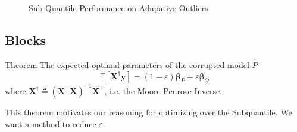 \documentclass[
11pt, %
serif
]{beamer}
\begin{document}
\begin{frame}
\begin{figure}[!t]
			\caption{Sub-Quantile Performance on Adapative Outliers}
			\label{fig:structure-unstructured-noise}
		\end{figure}
		
	\end{frame}
	
	
	\subsection{Blocks}
	
	\begin{frame}
		\begin{exampleblock}{Theorem}
			The expected optimal parameters of the corrupted model $\hat{P}$
			\begin{equation*}
				\label{eqn:corrupted-optimal}
				\mathbb{E}\left[\boldsymbol{X}^{\dagger}\boldsymbol{y} \right] = (1-\varepsilon)\boldsymbol{\beta}_P + \varepsilon\boldsymbol{\beta}_Q
			\end{equation*}
			where $\boldsymbol{X}^\dagger \triangleq \left(\boldsymbol{X}^\top\boldsymbol{X}\right)^{-1}\boldsymbol{X}^\top$, i.e. the Moore-Penrose Inverse. 
		\end{exampleblock}
		This theorem motivates our reasoning for optimizing over the Subquantile. We want a method to reduce $\varepsilon$. 
	\end{frame}
	
\end{document}
